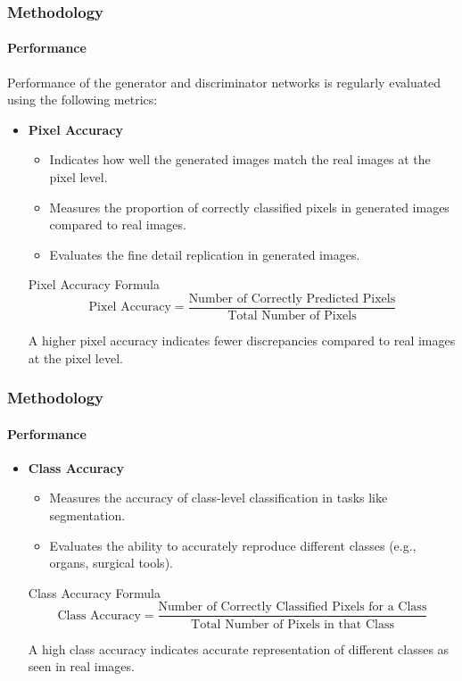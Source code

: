 \documentclass[aspectratio=169, lecture, amberg]{OTHAWbeamer}
\begin{document}
\begin{frame}[t]
    \frametitle{Methodology}
    \framesubtitle{Performance}

    Performance of the generator and discriminator networks is regularly evaluated using the following metrics:

    \begin{itemize}
        \item \textbf{Pixel Accuracy}
        \begin{itemize}
            \item Indicates how well the generated images match the real images at the pixel level.
            \item Measures the proportion of correctly classified pixels in generated images compared to real images.
            \item Evaluates the fine detail replication in generated images.

        \end{itemize}
        \begin{block}{Pixel Accuracy Formula}
        \[
        \text{Pixel Accuracy} = \frac{\text{Number of Correctly Predicted Pixels}}{\text{Total Number of Pixels}}
        \]
        \end{block}
        A higher pixel accuracy indicates fewer discrepancies compared to real images at the pixel level.
    \end{itemize}
    
\end{frame}



\begin{frame}[t]
    \frametitle{Methodology}
    \framesubtitle{Performance}

    \begin{itemize}
        \item \textbf{Class Accuracy}
        \begin{itemize}
            \item Measures the accuracy of class-level classification in tasks like segmentation.
            \item Evaluates the ability to accurately reproduce different classes (e.g., organs, surgical tools). \\

        \end{itemize}
        \begin{block}{Class Accuracy Formula}
        \[
         \text{Class Accuracy} = \frac{\text{Number of Correctly Classified Pixels for a Class}}{\text{Total Number of Pixels in that Class}}
            \]
        \end{block}
        A high class accuracy indicates accurate representation of different classes as seen in real images.
    \end{itemize}
    
\end{frame}
\end{document}
